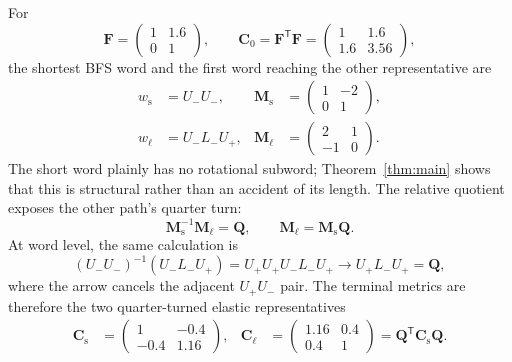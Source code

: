 \documentclass[11pt]{article}
\newcommand{\trans}{\mathsf{T}}
\newcommand{\Uplus}{U_{+}}
\newcommand{\Uminus}{U_{-}}
\newcommand{\Lminus}{L_{-}}
\theoremstyle{definition}
\begin{document}
For
\begin{equation}
 \mathbf F=\begin{pmatrix}1&1.6\\0&1\end{pmatrix},
 \qquad
 \mathbf C_0=\mathbf F^\trans\mathbf F
 =\begin{pmatrix}1&1.6\\1.6&3.56\end{pmatrix},
\end{equation}
the shortest BFS word and the first word reaching the other representative
are
\begin{align}
 w_{\mathrm s}&=\Uminus\Uminus,
 &\mathbf M_{\mathrm s}&=
 \begin{pmatrix}1&-2\\0&1\end{pmatrix},\\
 w_{\ell}&=\Uminus\Lminus\Uplus,
 &\mathbf M_{\ell}&=
 \begin{pmatrix}2&1\\-1&0\end{pmatrix}.
\end{align}
The short word plainly has no rotational subword; Theorem~\ref{thm:main}
shows that this is structural rather than an accident of its length.  The
relative quotient exposes the other path's quarter turn:
\begin{equation}
 \mathbf M_{\mathrm s}^{-1}\mathbf M_{\ell}
 =\mathbf Q,
 \qquad
 \mathbf M_{\ell}=\mathbf M_{\mathrm s}\mathbf Q.
 \label{eq:examplequotient}
\end{equation}
At word level, the same calculation is
\begin{equation}
 (\Uminus\Uminus)^{-1}
 (\Uminus\Lminus\Uplus)
 =\Uplus\Uplus\Uminus\Lminus\Uplus
 \longrightarrow \Uplus\Lminus\Uplus
 =\mathbf Q,
 \label{eq:wordcancellation}
\end{equation}
where the arrow cancels the adjacent \(\Uplus\Uminus\) pair.  The terminal
metrics are therefore the two quarter-turned elastic representatives
\begin{align}
 \mathbf C_{\mathrm s}
 &=\begin{pmatrix}1&-0.4\\-0.4&1.16\end{pmatrix},&
 \mathbf C_{\ell}
 &=\begin{pmatrix}1.16&0.4\\0.4&1\end{pmatrix}
 =\mathbf Q^\trans\mathbf C_{\mathrm s}\mathbf Q.
\end{align}
\end{document}
